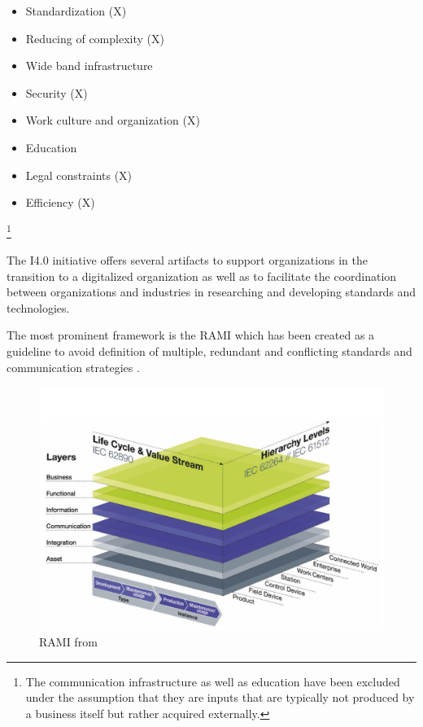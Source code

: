 \begin{itemize}
	\item  Standardization (X)
	\item  Reducing of complexity (X)
	\item  Wide band infrastructure
	\item  Security (X)
	\item  Work culture and organization (X)
	\item  Education
	\item  Legal constraints (X)
	\item  Efficiency (X)
\end{itemize}
\footnote{The communication infrastructure as well as education have been excluded under the assumption that they are inputs that are typically not produced by a business itself but rather acquired externally.}

The I4.0 initiative offers several artifacts to support organizations in the transition to a digitalized organization as well as to facilitate the coordination between organizations and industries in researching and developing standards and technologies. 

The most prominent framework is the \ac{RAMI} which has been created as a guideline to avoid definition of multiple, redundant and conflicting standards and communication strategies \cite[p. 41]{umsetzungsstrategie:2015}.

\begin{figure}[H]
\centering
\includegraphics[width=1\columnwidth]{images/RAMI}
\caption{\ac{RAMI} from \citeauthor{umsetzungsstrategie:2015}}
\end{figure}

